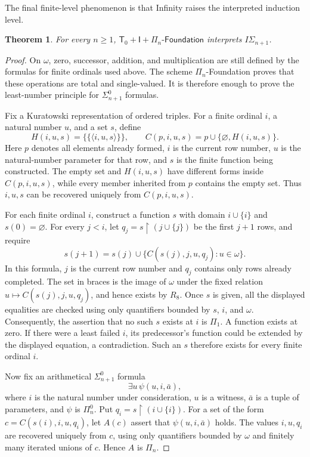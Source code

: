\documentclass[11pt,a4paper]{article}
\newcommand{\IS}[1]{I\Sigma_{#1}}
\newcommand{\Tzero}{\mathsf T_{0}}
\newcommand{\Fnd}[1]{#1\text{-}\mathsf{Foundation}}
\newcommand{\Inf}{\mathsf I}
\theoremstyle{plain}
\newtheorem{theorem}{Theorem}[section]
\theoremstyle{definition}
\theoremstyle{remark}
\begin{document}
The final finite-level phenomenon is that Infinity raises the interpreted induction level.
\begin{theorem}
  For every \(n\geq1\), \(\Tzero+\Inf+\Fnd{\Pi_n}\) interprets \(\IS{n+1}\).
\end{theorem}
\begin{proof}
  On \(\omega\), zero, successor, addition, and multiplication are still defined by the formulas for finite ordinals used above. The scheme \(\Pi_n\)-Foundation proves that these operations are total and single-valued. It is therefore enough to prove the least-number principle for \(\Sigma_{n+1}^0\) formulas.

  Fix a Kuratowski representation of ordered triples. For a finite ordinal \(i\), a natural number \(u\), and a set \(s\), define
  \[
    H(i,u,s)=\bigl\{\{\langle i,u,s\rangle\}\bigr\},
    \qquad C(p,i,u,s)=p\cup\{\varnothing,H(i,u,s)\}.
  \]
  Here \(p\) denotes all elements already formed, \(i\) is the current row number, \(u\) is the natural-number parameter for that row, and \(s\) is the finite function being constructed. The empty set and \(H(i,u,s)\) have different forms inside \(C(p,i,u,s)\), while every member inherited from \(p\) contains the empty set. Thus \(i,u,s\) can be recovered uniquely from \(C(p,i,u,s)\).

  For each finite ordinal \(i\), construct a function \(s\) with domain \(i\cup\{i\}\) and \(s(0)=\varnothing\). For every \(j<i\), let \(q_j=s\upharpoonright(j\cup\{j\})\) be the first \(j+1\) rows, and require
  \[
    s(j+1)=s(j)\cup\{C(s(j),j,u,q_j):u\in\omega\}.
  \]
  In this formula, \(j\) is the current row number and \(q_j\) contains only rows already completed. The set in braces is the image of \(\omega\) under the fixed relation \(u\mapsto C(s(j),j,u,q_j)\), and hence exists by \(R_8\). Once \(s\) is given, all the displayed equalities are checked using only quantifiers bounded by \(s\), \(i\), and \(\omega\). Consequently, the assertion that no such \(s\) exists at \(i\) is \(\Pi_1\). A function exists at zero. If there were a least failed \(i\), its predecessor's function could be extended by the displayed equation, a contradiction. Such an \(s\) therefore exists for every finite ordinal \(i\).

  Now fix an arithmetical \(\Sigma_{n+1}^0\) formula
  \[
    \exists u\,\psi(u,i,\bar a),
  \]
  where \(i\) is the natural number under consideration, \(u\) is a witness, \(\bar a\) is a tuple of parameters, and \(\psi\) is \(\Pi_n^0\). Put \(q_i=s\upharpoonright(i\cup\{i\})\). For a set of the form \(c=C(s(i),i,u,q_i)\), let \(A(c)\) assert that \(\psi(u,i,\bar a)\) holds. The values \(i,u,q_i\) are recovered uniquely from \(c\), using only quantifiers bounded by \(\omega\) and finitely many iterated unions of \(c\). Hence \(A\) is \(\Pi_n\).


\end{proof}
\end{document}

